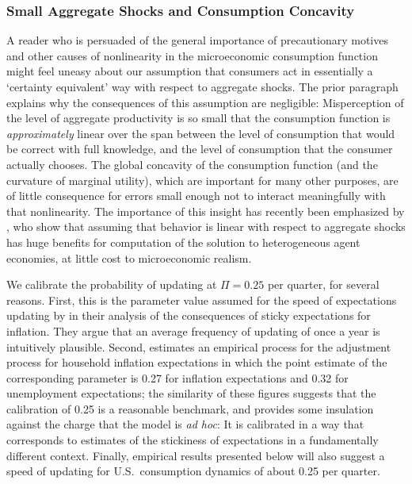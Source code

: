 \documentclass[titlepage]{./econtex}
\begin{document}
\subsubsection{Small Aggregate Shocks and Consumption Concavity}
A reader who is persuaded of the general importance of precautionary motives and other causes of nonlinearity in the microeconomic consumption function might feel uneasy about our assumption that consumers act in essentially a `certainty equivalent' way with respect to aggregate shocks.  The prior paragraph explains why the consequences of this assumption are negligible: Misperception of the level of aggregate productivity is so small that the consumption function is \textit{approximately} linear over the span between the level of consumption that would be correct with full knowledge, and the level of consumption that the consumer actually chooses.  The global concavity of the consumption function (and the curvature of marginal utility), which are important for many other purposes, are of little consequence for errors small enough not to interact meaningfully with that nonlinearity.  The importance of this insight has recently been emphasized by \cite{bmpMITshocks}, who show that assuming that behavior is linear with respect to aggregate shocks has huge benefits for computation of the solution to heterogeneous agent economies, at little cost to microeconomic realism.

We calibrate the probability of updating at $\Pi= %
0.25 %
 $ per quarter, for several reasons.  First, this is the parameter value assumed for the speed of expectations updating by \cite{mrSlumps} in their analysis of the consequences of sticky expectations for inflation.  They argue that an average frequency of updating of once a year is intuitively plausible.  Second, \cite{carroll:epidemicinflQJE} estimates an empirical process for the adjustment process for household inflation expectations in which the point estimate of the corresponding parameter is 0.27 for inflation expectations and 0.32 for unemployment expectations; the similarity of these figures suggests that the \cite{mrSlumps} calibration of 0.25 is a reasonable benchmark, and provides some insulation against the charge that the model is {\it ad hoc}: It is calibrated in a way that corresponds to estimates of the stickiness of expectations in a fundamentally different context.  Finally, empirical results presented below will also suggest a speed of updating for U.S.\ consumption dynamics of about 0.25 per quarter.
\end{document}
